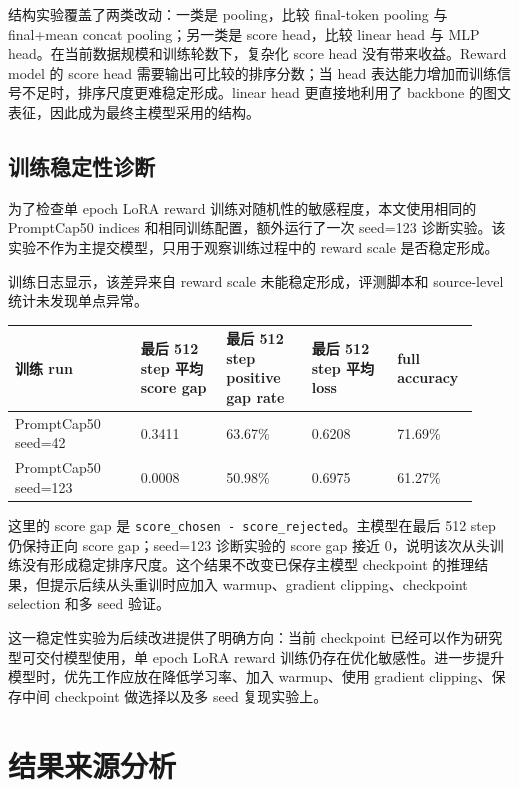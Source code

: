 \documentclass[11pt,a4paper]{ctexart}
\begin{document}
结构实验覆盖了两类改动：一类是 pooling，比较 final-token pooling 与 final+mean concat pooling；另一类是 score head，比较 linear head 与 MLP head。在当前数据规模和训练轮数下，复杂化 score head 没有带来收益。Reward model 的 score head 需要输出可比较的排序分数；当 head 表达能力增加而训练信号不足时，排序尺度更难稳定形成。linear head 更直接地利用了 backbone 的图文表征，因此成为最终主模型采用的结构。

\subsection{训练稳定性诊断}

为了检查单 epoch LoRA reward 训练对随机性的敏感程度，本文使用相同的 PromptCap50 indices 和相同训练配置，额外运行了一次 seed=123 诊断实验。该实验不作为主提交模型，只用于观察训练过程中的 reward scale 是否稳定形成。

训练日志显示，该差异来自 reward scale 未能稳定形成，评测脚本和 source-level 统计未发现单点异常。

\begin{center}\small
\begin{longtable}{p{0.25\linewidth} p{0.17\linewidth} p{0.17\linewidth} p{0.17\linewidth} p{0.16\linewidth}}
\toprule
训练 run & 最后 512 step 平均 score gap & 最后 512 step positive gap rate & 最后 512 step 平均 loss & full accuracy \\
\midrule
PromptCap50 seed=42 & 0.3411 & 63.67\% & 0.6208 & 71.69\% \\
PromptCap50 seed=123 & 0.0008 & 50.98\% & 0.6975 & 61.27\% \\
\bottomrule
\end{longtable}\end{center}

这里的 score gap 是 \texttt{score\_chosen - score\_rejected}。主模型在最后 512 step 仍保持正向 score gap；seed=123 诊断实验的 score gap 接近 0，说明该次从头训练没有形成稳定排序尺度。这个结果不改变已保存主模型 checkpoint 的推理结果，但提示后续从头重训时应加入 warmup、gradient clipping、checkpoint selection 和多 seed 验证。

这一稳定性实验为后续改进提供了明确方向：当前 checkpoint 已经可以作为研究型可交付模型使用，单 epoch LoRA reward 训练仍存在优化敏感性。进一步提升模型时，优先工作应放在降低学习率、加入 warmup、使用 gradient clipping、保存中间 checkpoint 做选择以及多 seed 复现实验上。

\section{结果来源分析}
\end{document}
